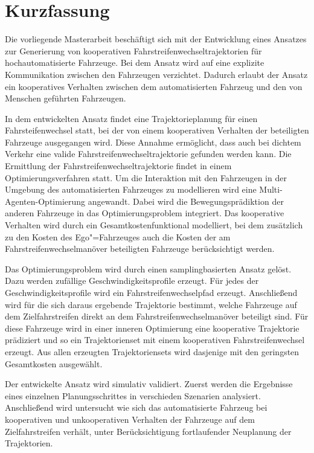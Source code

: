 

\chapter*{Kurzfassung}

Die vorliegende Masterarbeit besch\"aftigt sich mit der Entwicklung eines Ansatzes zur Generierung von kooperativen Fahrstreifenwechseltrajektorien f\"ur hochautomatisierte Fahrzeuge.
Bei dem Ansatz wird auf eine explizite Kommunikation zwischen den Fahrzeugen verzichtet.
Dadurch erlaubt der Ansatz ein kooperatives Verhalten zwischen dem automatisierten Fahrzeug und den von Menschen gef\"uhrten Fahrzeugen.

In dem entwickelten Ansatz findet eine Trajektorieplanung f\"ur einen Fahrsteifenwechsel statt, bei der von einem kooperativen Verhalten der beteiligten Fahrzeuge ausgegangen wird.
Diese Annahme erm\"oglicht, dass auch bei dichtem Verkehr eine valide Fahrstreifenwechseltrajektorie gefunden werden kann.
Die Ermittlung der Fahrstreifenwechseltrajektorie findet in einem Optimierungsverfahren statt.
Um die Interaktion mit den Fahrzeugen in der Umgebung des automatisierten Fahrzeuges zu modellieren wird eine Multi-Agenten-Optimierung angewandt. 
Dabei wird die Bewegungspr\"adiktion der anderen Fahrzeuge in das Optimierungsproblem integriert.
Das kooperative Verhalten wird durch ein Gesamtkostenfunktional modelliert, bei dem zus\"atzlich zu den Kosten des Ego"=Fahrzeuges auch die Kosten der am Fahrstreifenwechselman\"over beteiligten Fahrzeuge ber\"ucksichtigt werden.

Das Optimierungsproblem wird durch einen samplingbasierten Ansatz gel\"ost.
Dazu werden zuf\"allige Geschwindigkeitsprofile erzeugt.
F\"ur jedes der Geschwindigkeitsprofile wird ein Fahrstreifenwechselpfad erzeugt.
Anschlie{\ss}end wird f\"ur die sich daraus ergebende Trajektorie bestimmt, welche Fahrzeuge auf dem Zielfahrstreifen direkt an dem Fahrstreifenwechselman\"over beteiligt sind.
F\"ur diese Fahrzeuge wird in einer inneren Optimierung eine kooperative Trajektorie pr\"adiziert und so ein Trajektorienset mit einem kooperativen Fahrstreifenwechsel erzeugt.
Aus allen erzeugten Trajektoriensets wird dasjenige mit den geringsten Gesamtkosten ausgew\"ahlt.

Der entwickelte Ansatz wird simulativ validiert. 
Zuerst werden die Ergebnisse eines einzelnen Planungsschrittes in verschieden Szenarien analysiert. 
Anschlie{\ss}end wird untersucht wie sich das automatisierte Fahrzeug bei kooperativen und unkooperativen Verhalten der Fahrzeuge auf dem Zielfahrstreifen verh\"alt, unter Ber\"ucksichtigung fortlaufender Neuplanung der Trajektorien.

